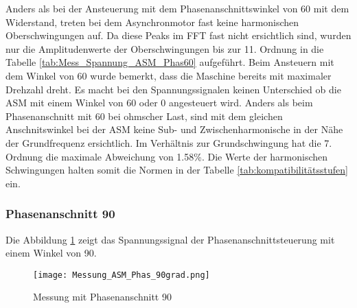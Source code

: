 Anders als bei der Ansteuerung mit dem Phasenanschnittswinkel von 60\textdegree\hspace{0.02cm} mit dem Widerstand, treten bei dem Asynchronmotor fast keine harmonischen Oberschwingungen auf. Da diese Peaks im FFT fast nicht ersichtlich sind, wurden nur die Amplitudenwerte der Oberschwingungen bis zur 11. Ordnung in die Tabelle \ref{tab:Mess_Spannung_ASM_Phas60} aufgeführt. 
Beim Ansteuern mit dem Winkel von 60\textdegree \hspace{0.02cm} wurde bemerkt, dass die Maschine bereits mit maximaler Drehzahl dreht. Es macht bei den Spannungssignalen keinen Unterschied ob die ASM mit einem Winkel von 60\textdegree \hspace{0.02cm} oder 0\textdegree \hspace{0.02cm} angesteuert wird. Anders als beim Phasenanschnitt mit 60\textdegree\hspace{0.02cm} bei ohmscher Last, sind mit dem gleichen Anschnitswinkel bei der ASM keine Sub- und Zwischenharmonische in der Nähe der Grundfrequenz ersichtlich. Im Verhältnis zur Grundschwingung hat die 7. Ordnung die maximale Abweichung von 1.58\%. Die Werte der harmonischen Schwingungen halten somit die Normen in der Tabelle \ref{tab:kompatibilitätsstufen} ein. 

\newpage
\subsubsection*{Phasenanschnitt 90\textdegree}
Die Abbildung \ref{fig:Mess_ASM_Phas90} zeigt das Spannungssignal der Phasenanschnittsteuerung mit einem Winkel von 90\textdegree.

\begin{figure}[ht!]
	\centering
	\texttt{[image: Messung\_ASM\_Phas\_90grad.png]}	
	\caption{Messung mit Phasenanschnitt 90\textdegree}\label{fig:Mess_ASM_Phas90}
\end{figure}

